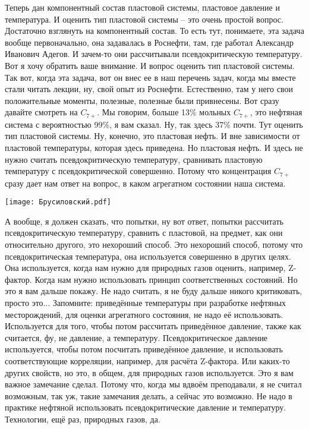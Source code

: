 \documentclass[main.tex]{subfiles}
\begin{document}
Теперь дан компонентный состав пластовой системы, пластовое давление и температура.
И оценить тип пластовой системы -- это очень простой вопрос.
Достаточно взглянуть на компонентный состав.
То есть тут, понимаете, эта задача вообще первоначально, она задавалась в Роснефти, там, где работал Александр Иванович Адегов.
И зачем-то они рассчитывали псевдокритическую температуру.
Вот я хочу обратить ваше внимание.
И вопрос оценить тип пластовой системы.
Так вот, когда эта задача, вот он внес ее в наш перечень задач, когда мы вместе стали читать лекции, ну, свой опыт из Роснефти.
Естественно, там у него свои положительные моменты, полезные, полезные были привнесены.
Вот сразу давайте смотреть на $C_{7+}$.
Мы говорим, больше 13\% мольных $C_{7+}$, это нефтяная система с вероятностью 99\%, я вам сказал.
Ну, так здесь 37\% почти.
Тут оценить тип пластовой системы.
Ну, конечно, это пластовая нефть.
И вне зависимости от пластовой температуры, которая здесь приведена.
Но пластовая нефть.
И здесь не нужно считать псевдокритическую температуру, сравнивать пластовую температуру с псевдокритической совершенно.
Потому что концентрация $C_{7+}$ сразу дает нам ответ на вопрос, в каком агрегатном состоянии наша система.

\begin{center}
\texttt{[image: Брусиловский.pdf]}
\end{center}

А вообще, я должен сказать, что попытки, ну вот ответ, попытки рассчитать псевдокритическую температуру, сравнить с пластовой, на предмет, как они относительно другого, это нехороший способ.
Это нехороший способ, потому что псевдокритическая температура, она используется совершенно в других целях.
Она используется, когда нам нужно для природных газов оценить, например, Z-фактор.
Когда нам нужно использовать принцип соответственных состояний.
Но это я вам дальше покажу.
Не надо считать, я не буду дальше никого критиковать, просто это...
Запомните: приведённые температуры при разработке нефтяных месторождений, для оценки агрегатного состояния, не надо её использовать.
Используется для того, чтобы потом рассчитать приведённое давление, также как считается, фу, не давление, а температуру.
Псевдокритическое давление используется, чтобы потом посчитать приведённое давление, и использовать соответствующие корреляции, например, для расчёта Z-фактора.
Или каких-то других свойств, но это, в общем, для природных газов используется.
Это я вам важное замечание сделал.
Потому что, когда мы вдвоём преподавали, я не считал возможным, так уж, такие замечания делать, а сейчас это возможно.
Не надо в практике нефтяной использовать псевдокритические давление и температуру.
Технологии, ещё раз, природных газов, да.
\end{document}
